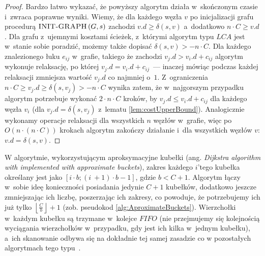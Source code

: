 \newpage
\begin{proof}

Bardzo łatwo wykazać, że powyższy algorytm działa w~skończonym czasie i~zwraca poprawne wyniki. Wiemy, że dla każdego węzła $v$ po inicjalizacji grafu procedurą $ \textrm{\textsc{INIT-GRAPH}} \left( G, s \right)$ zachodzi $v.d \geqslant \delta \left( s, v \right)$ a~dodatkowo $n \cdot C \geqslant v.d$. Dla grafu z~ujemnymi kosztami ścieżek, z~którymi algorytm typu $LCA$ jest w~stanie sobie poradzić, możemy także dopisać $ \delta \left( s, v \right) > - n \cdot C$. Dla każdego znalezionego łuku $e_{ij}$ w~grafie, takiego że zachodzi $v_{j}.d > v_{i}.d + c_{ij}$ algorytm wykonuje relaksację, po której $v_{j}.d = v_{i}.d + c_{ij}$~--- inaczej mówiąc podczas każdej relaksacji zmniejsza wartość $v_{j}.d$ co najmniej o~$1$. Z~ograniczenia $ n \cdot C \geqslant v_{j}.d \geqslant \delta \left( s, v_{j} \right) > - n \cdot C$ wynika zatem, że w~najgorszym przypadku algorytm potrzebuje wykonać $2 \cdot n \cdot C$ kroków, by $v_{j}.d \leqslant v_{i}.d + c_{ij}$ dla każdego węzła $v_{i}$ (dla $v_{j}.d = \delta \left( s, v_{j} \right)$ z~lematu \ref{lem:costUpperBound}). Analogicznie wykonamy operacje relaksacji dla wszystkich $n$ węzłów w~grafie, więc po $O \left( n \cdot \left( n \cdot C \right) \right) $ krokach algorytm zakończy działanie i~dla wszystkich węzłów $v$: $v.d = \delta \left( s, v \right)$.

\end{proof}

W algorytmie, wykorzystującym aproksymacyjne kubełki (ang. \textit{Dijkstra algorithm with implemented with approximate buckets}), zakres każdego $i$'tego kubełka określany jest jako $ \left[ i \cdot b ; \left( i~+ 1 \right) \cdot b - 1 \right]$, gdzie $b < C + 1$. Algorytm łączy w~sobie ideę konieczności posiadania jedynie $C+1$ kubełków, dodatkowo jeszcze zmniejszając ich liczbę, poszerzając ich zakresy, co powoduje, że potrzebujemy ich już tylko $\left \lfloor \frac{C}{b} \right \rfloor + 1$ (zob. pseudokod \ref{alg:AproximateBuckets}). Wierzchołki w~każdym kubełku są trzymane w~kolejce $FIFO$ (nie przejmujemy się kolejnością wyciągania wierzchołków w~przypadku, gdy jest ich kilka w~jednym kubełku), a~ich skanowanie odbywa się na dokładnie tej samej zasadzie co w pozostałych algorytmach tego typu~\cite[$23$--$24$]{Dissertation}.

